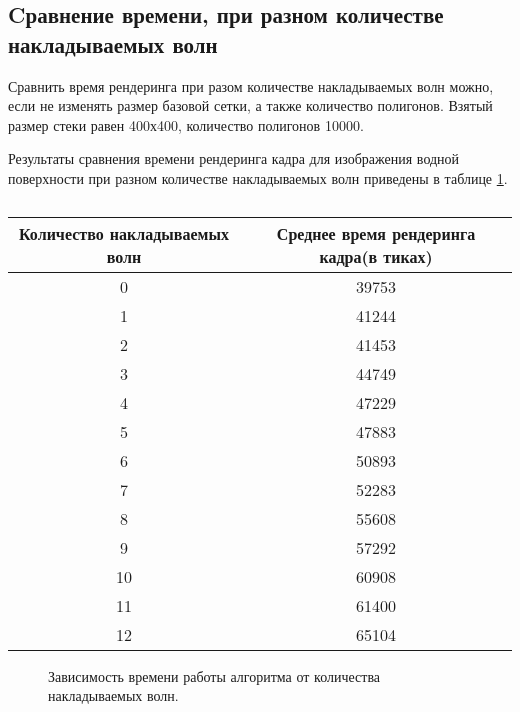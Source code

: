 \newpage
\subsection{Cравнение времени, при разном количестве накладываемых волн}


Сравнить время рендеринга при разом количестве накладываемых волн можно, если не изменять размер базовой сетки, а также количество полигонов. Взятый размер стеки равен 400х400, количество полигонов 10000.

Результаты сравнения времени рендеринга кадра для изображения водной поверхности при разном количестве накладываемых волн приведены в таблице \ref{tab:wave}.

\newpage
\begin{table}[h!]
	\caption{}
	\label{tab:wave}
	\begin{center}
		\begin{tabular}{|c | c|} 
			\hline
			Количество накладываемых волн & Среднее время рендеринга кадра(в тиках) \\  
			\hline
			0 & 39753  \\
			\hline
			1 & 41244  \\
			\hline
			2 &  41453 \\
			\hline
			3 &  44749 \\
			\hline
			4 &  47229  \\
			\hline
			5 &  47883  \\
			\hline
			6 &  50893  \\
			\hline
			7 & 52283  \\
			\hline
			8 & 55608  \\
			\hline
			9 & 57292  \\
			\hline
			10 &  60908 \\
			\hline
			11 & 61400 \\
			\hline
			12 & 65104  \\
			\hline
		\end{tabular}
	\end{center}
\end{table}


\begin{figure}[h]
	\centering
	\captionsetup{justification=centering}
	\caption{Зависимость времени работы алгоритма от количества накладываемых волн.}
	\label{plt:time_img2}
\end{figure}



